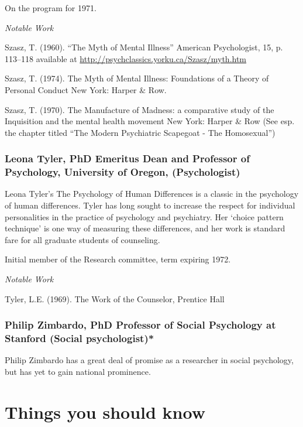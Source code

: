 \begin{refsection}
On the program for 1971.

\emph{Notable Work}

Szasz, T. (1960). “The Myth of Mental Illness” American Psychologist, 15, p. 113--118 available at \url{http://psychclassics.yorku.ca/Szasz/myth.htm}

Szasz, T. (1974). The Myth of Mental Illness: Foundations of a Theory of Personal Conduct New York: Harper \& Row.

Szasz, T. (1970). The Manufacture of Madness: a comparative study of the Inquisition and the mental health movement New York: Harper \& Row (See esp. the chapter titled “The Modern Psychiatric Scapegoat - The Homosexual”)

\subsubsection{Leona Tyler, PhD Emeritus Dean and Professor of Psychology, University of Oregon, (Psychologist)}
\label{leonatylerphdemeritusdeanandprofessorofpsychologyuniversityoforegonpsychologist}

Leona Tyler's The Psychology of Human Differences is a classic in the psychology of human differences. Tyler has long sought to increase the respect for individual personalities in the practice of psychology and psychiatry. Her `choice pattern technique' is one way of measuring these differences, and her work is standard fare for all graduate students of counseling.

Initial member of the Research committee, term expiring 1972.

\emph{Notable Work}

Tyler, L.E. (1969). The Work of the Counselor, Prentice Hall

\subsubsection{Philip Zimbardo, PhD Professor of Social Psychology at Stanford (Social psychologist)*}
\label{philipzimbardophdprofessorofsocialpsychologyatstanfordsocialpsychologist}

Philip Zimbardo has a great deal of promise as a researcher in social psychology, but has yet to gain national prominence.

\section{Things you should know}
\label{thingsyoushouldknow}


\end{refsection}
